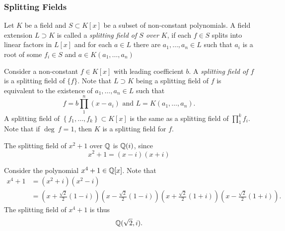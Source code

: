 \subsubsection{Splitting Fields}
    \begin{definition}
        Let $K$ be a field and $S\subset K[x]$ be a subset of non-constant polynomials. A field extension $L\supset K$ is called a \emph{splitting field of $S$ over $K$}, if each $f\in S$ splits into linear factors in $L[x]$ and for each $a\in L$ there are $a_1,\dots,a_n\in L$ such that $a_i$ is a root of some $f_i\in S$ and $a\in K(a_1,\dots,a_n)$  
    \end{definition}
    \begin{remark}
        Consider a non-constant $f\in K[x]$ with leading coefficient $b$. A \emph{splitting field of $f$} is a splitting field of $\{f\}$. Note that $L\supset K$ being a splitting field of $f$ is equivalent to the existence of $a_1,\dots,a_n\in L$ such that 
        $$
            f = b\prod_1^n (x-a_i) \text{ and } L = K(a_1,\dots,a_n).
        $$
        A splitting field of $\left\{f_1,\dots,f_k\right\}\subset K[x]$ is the same as a splitting field of $\prod_1^k f_i$. Note that if $\deg \ f = 1$, then $K$ is a splitting field for $f$. 
    \end{remark}
     \begin{example}
        The splitting field of $x^2+1$ over $\mathbb{Q}$ is $\mathbb{Q}(i)$, since 
        $$
            x^2+1=(x-i)(x+i)
        $$
    \end{example}
    \begin{example}
        Consider the polynomial $x^4 + 1\in \mathbb{Q}[x]$. Note that 
        \begin{align*}
            x^4 +1 &= (x^2+i)(x^2-i) \\
            &= \left(x+\frac{\sqrt{2}}{2}\left( 1-i\right)\right)\left(x-\frac{\sqrt{2}}{2}\left( 1-i\right)\right)\left(x+\frac{\sqrt{2}}{2}\left( 1+i\right)\right)\left(x-\frac{\sqrt{2}}{2}\left( 1+i\right)\right).
        \end{align*}
        The splitting field of $x^4+1$ is thus 
        $$
            \mathbb{Q}(\sqrt{2},i).
        $$
    \end{example}
    
